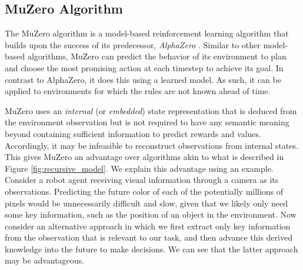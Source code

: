 \newcommand{\policy}{\text{\textbf{p}}}
\newcommand{\svalue}{\nu}

\subsection{MuZero Algorithm}
The MuZero algorithm \cite{muzero} is a model-based reinforcement learning algorithm that builds upon the success of its predecessor, \textit{AlphaZero} \cite{alphazero}. Similar to other model-based algorithms, MuZero can predict the behavior of its environment to plan and choose the most promising action at each timestep to achieve its goal. In contrast to AlphaZero, it does this using a learned model. As such, it can be applied to environments for which the rules are not known ahead of time.

MuZero uses an \textit{internal} (or \textit{embedded}) state representation that is deduced from the environment observation but is not required to have any semantic meaning beyond containing sufficient information to predict rewards and values. Accordingly, it may be infeasible to reconstruct observations from internal states. This gives MuZero an advantage over algorithms akin to what is described in Figure \ref{fig:recursive_model}. We explain this advantage using an example. Consider a robot agent receiving visual information through a camera as its observations. Predicting the future color of each of the potentially millions of pixels would be unnecessarily difficult and slow, given that we likely only need some key information, such as the position of an object in the environment. Now consider an alternative approach in which we first extract only key information from the observation that is relevant to our task, and then advance this derived knowledge into the future to make decisions. We can see that the latter approach may be advantageous.


